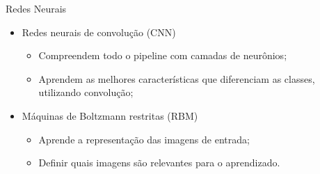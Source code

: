 \documentclass{beamer}
\begin{document}
\begin{frame}{Redes Neurais}
\setlength\leftmargini{0em}
\justifying
  \begin{itemize}
    \item Redes neurais de convolução (CNN)%
    \begin{itemize}
    \item Compreendem todo o pipeline com camadas de neurônios;
    \item Aprendem as melhores características que diferenciam as classes, utilizando convolução;
    \end{itemize}
    \item Máquinas de Boltzmann restritas (RBM)
    \begin{itemize}
        \item Aprende a representação das imagens de entrada;
        \item Definir quais imagens são relevantes para o aprendizado.
    \end{itemize}
  \end{itemize}
\end{frame}
\end{document}
